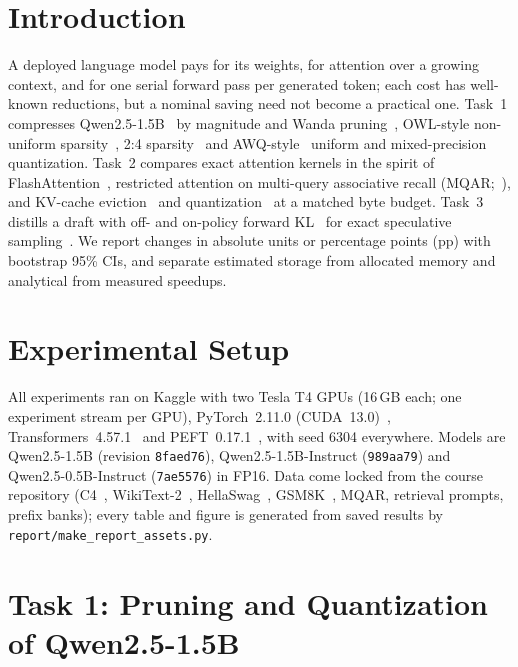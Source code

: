 \documentclass{article}
\begin{document}
\section{Introduction}
A deployed language model pays for its weights, for attention over a growing context, and for one serial forward pass per
generated token; each cost has well-known reductions, but a nominal saving need not become a practical one. Task~1
compresses Qwen2.5-1.5B~\citep{qwen2024qwen25} by magnitude and Wanda pruning~\citep{sun2024wanda}, OWL-style non-uniform
sparsity~\citep{yin2024owl}, 2:4 sparsity~\citep{mishra2021accelerating} and AWQ-style~\citep{lin2024awq} uniform and
mixed-precision quantization. Task~2 compares exact attention kernels in the spirit of FlashAttention~\citep{dao2022flashattention},
restricted attention on multi-query associative recall (MQAR;~\citealp{arora2024zoology}), and KV-cache
eviction~\citep{xiao2024streamingllm,zhang2023h2o} and quantization~\citep{liu2024kivi} at a matched byte budget. Task~3
distills a draft with off- and on-policy forward KL~\citep{agarwal2024gkd,zhou2024distillspec} for exact speculative
sampling~\citep{leviathan2023fast,chen2023accelerating}. We report changes in absolute units or percentage points (pp)
with bootstrap 95\% CIs, and separate estimated storage from allocated memory and analytical from measured speedups.

\section{Experimental Setup}
All experiments ran on Kaggle with two Tesla T4 GPUs (16\,GB each; one experiment stream per GPU), PyTorch~2.11.0
(CUDA~13.0)~\citep{paszke2019pytorch}, Transformers~4.57.1~\citep{wolf2020transformers} and PEFT~0.17.1~\citep{peft}, with seed 6304
everywhere. Models are Qwen2.5-1.5B (revision \texttt{8faed76}), Qwen2.5-1.5B-Instruct (\texttt{989aa79}) and
Qwen2.5-0.5B-Instruct (\texttt{7ae5576}) in FP16. Data come locked from the course repository (C4~\citep{raffel2020c4},
WikiText-2~\citep{merity2017wikitext}, HellaSwag~\citep{zellers2019hellaswag}, GSM8K~\citep{cobbe2021gsm8k}, MQAR, retrieval
prompts, prefix banks); every table and figure is generated from saved results by \nolinkurl{report/make_report_assets.py}.

\section{Task 1: Pruning and Quantization of Qwen2.5-1.5B}
\label{sec:task1}
\end{document}
